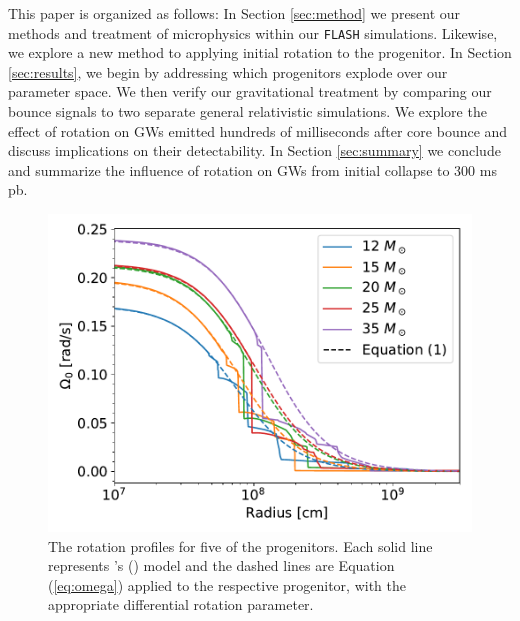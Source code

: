 \documentclass[twocolumn,times]{aastex62}  %
\begin{document}
This paper is organized as follows:  In Section \ref{sec:method} we present our methods and treatment of microphysics within our \texttt{FLASH} simulations.  Likewise, we explore a new method to applying initial rotation to the progenitor.  In Section \ref{sec:results}, we begin by addressing which progenitors explode over our parameter space.  We then verify our gravitational treatment by comparing our bounce signals to two separate general relativistic simulations.  We explore the effect of rotation on GWs emitted hundreds of milliseconds after core bounce and discuss implications on their detectability.  In Section \ref{sec:summary} we conclude and summarize the influence of rotation on GWs from initial collapse to 300 ms pb. 


\begin{figure}[t]
    \centering
    \includegraphics[scale=0.45]{figures/omega_vs_r.pdf}
    \caption{The rotation profiles for five of the \citet{heger:2005} progenitors.  Each solid line represents \citeauthor{heger:2005}'s (\citeyear{heger:2005}) model and the dashed lines are Equation (\ref{eq:omega}) applied to the respective progenitor, with the appropriate differential rotation parameter.  }
    \label{fig:ovsr}
\end{figure}
\end{document}
